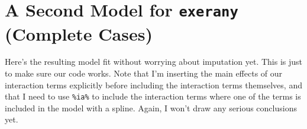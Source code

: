 \documentclass[]{book}
\newenvironment{Shaded}{\begin{snugshade}}{\end{snugshade}}
\newcommand{\KeywordTok}[1]{\textcolor[rgb]{0.13,0.29,0.53}{\textbf{#1}}}
\newcommand{\DataTypeTok}[1]{\textcolor[rgb]{0.13,0.29,0.53}{#1}}
\newcommand{\DecValTok}[1]{\textcolor[rgb]{0.00,0.00,0.81}{#1}}
\newcommand{\StringTok}[1]{\textcolor[rgb]{0.31,0.60,0.02}{#1}}
\newcommand{\OperatorTok}[1]{\textcolor[rgb]{0.81,0.36,0.00}{\textbf{#1}}}
\newcommand{\NormalTok}[1]{#1}
\theoremstyle{definition}
\theoremstyle{definition}
\theoremstyle{definition}
\theoremstyle{remark}
\begin{document}
\section{\texorpdfstring{A Second Model for \texttt{exerany} (Complete
Cases)}{A Second Model for exerany (Complete Cases)}}\label{a-second-model-for-exerany-complete-cases}

Here's the resulting model fit without worrying about imputation yet.
This is just to make sure our code works. Note that I'm inserting the
main effects of our interaction terms explicitly before including the
interaction terms themselves, and that I need to use \texttt{\%ia\%} to
include the interaction terms where one of the terms is included in the
model with a spline. Again, I won't draw any serious conclusions yet.

\begin{Shaded}
\end{Shaded}
\end{document}
